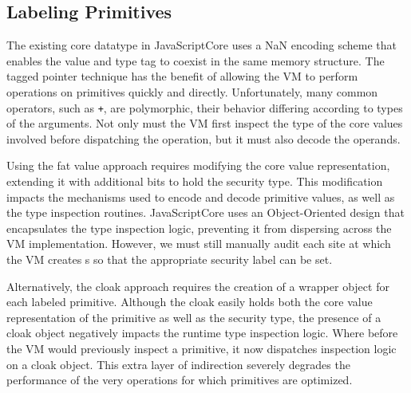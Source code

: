 \subsection{Labeling Primitives}\label{sec:primitives}


The existing core datatype in JavaScriptCore uses a NaN encoding scheme that enables the value and type tag to coexist in the same memory structure.
The tagged pointer technique has the benefit of allowing the VM to perform operations on primitives quickly and directly.
Unfortunately, many common operators, such as \texttt{+}, are polymorphic, their behavior differing according to types of the arguments.
Not only must the VM first inspect the type of the core values involved before dispatching the operation, but it must also decode the operands.

Using the fat value approach requires modifying the core value representation, extending it with additional bits to hold the security type.
This modification impacts the mechanisms used to encode and decode primitive values, as well as the type inspection routines.
JavaScriptCore uses an Object-Oriented design that encapsulates the type inspection logic, preventing it from dispersing across the VM implementation.
However, we must still manually audit each site at which the VM creates s so that the appropriate security label can be set.

Alternatively, the cloak approach requires the creation of a wrapper object for each labeled primitive.
Although the cloak easily holds both the core value representation of the primitive as well as the security type, the presence of a cloak object negatively impacts the runtime type inspection logic.
Where before the VM would previously inspect a primitive, it now dispatches inspection logic on a cloak object.
This extra layer of indirection severely degrades the performance of the very operations for which primitives are optimized.

